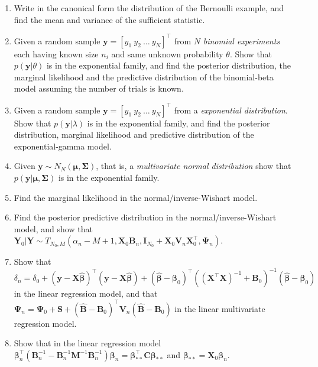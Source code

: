 \begin{enumerate}
	\item Write in the canonical form the distribution of the Bernoulli example, and find the mean and variance of the sufficient statistic.
	
	\item Given a random sample $\bm{y}=[y_1 \ y_2 \ \dots \ y_N]^{\top}$ from $N$ \textit{binomial experiments} each having known size $n_i$ and same unknown probability $\theta$. Show that $p(\bm{y}|\theta)$ is in the exponential family, and find the posterior distribution, the marginal likelihood and the predictive distribution of the binomial-beta model assuming the number of trials is known.
	
	\item Given a random sample $\bm{y}=[y_1 \ y_2 \ \dots \ y_N]^{\top}$ from a \textit{exponential distribution}. Show that $p(\bm{y}|\lambda)$ is in the exponential family, and find the posterior distribution, marginal likelihood and predictive distribution of the exponential-gamma model.
	
	\item Given $\bm{y}\sim N_N(\bm{\mu},\bm{\Sigma})$, that is, a \textit{multivariate normal distribution} show that $p(\bm{y}|\bm{\mu},\bm{\Sigma})$ is in the exponential family.
	
	\item Find the marginal likelihood in the normal/inverse-Wishart model.
	
	\item Find the posterior predictive distribution in the normal/inverse-Wishart model, and show that ${\bm{Y}}_0|{\bm{Y}}\sim T_{N_0,M}(\alpha_n-M+1,{\bm{X}}_0{\bm{B}}_n,{\bm{I}}_{N_0}+{\bm{X}}_0{\bm{V}}_n{\bm{X}}_0^{\top},{\bm{\Psi}}_n)$.
	
	\item Show that $\delta_n=\delta_0+({\bm{y}}-{\bm{X}}\hat{\bm{\beta}})^{\top}({\bm{y}}-{\bm{X}}\hat{\bm{\beta}})+(\hat{\bm{\beta}}-\bm{\beta}_0)^{\top}(({\bm{X}}^{\top}{\bm{X}})^{-1}+{\bm{B}}_0)^{-1}(\hat{\bm{\beta}}-\bm{\beta}_0)$ in the linear regression model, and that ${\bm{\Psi}}_{n}={\bm{\Psi}}_{0}+{\bm{S}}+(\hat{\bm{B}}-{\bm{B}}_{0})^{\top}{\bm{V}}_{n}(\hat{\bm{B}}-{\bm{B}}_{0})$ in the linear multivariate regression model. 
			
	\item Show that in the linear regression model $\bm{\beta}_n^{\top}({\bm{B}}_n^{-1}-{\bm{B}}_n^{-1}{\bm{M}}^{-1}{\bm{B}}_n^{-1})\bm{\beta}_n={\bm{\bm{\beta}}}_{**}^{\top}{\bm{C}}{\bm{\bm{\beta}}}_{**}$ and $\bm{\beta}_{**}={\bm{X}}_0\bm{\beta}_n$.
	

\end{enumerate}
